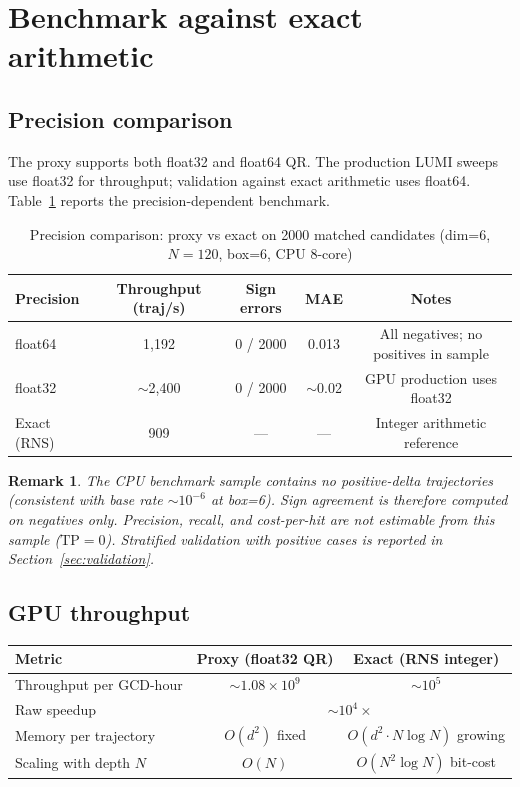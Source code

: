 \documentclass[11pt]{article}
\newtheorem{remark}{Remark}
\begin{document}
\section{Benchmark against exact arithmetic}
\label{sec:benchmark}

\subsection{Precision comparison}

The proxy supports both float32 and float64 QR. The production LUMI sweeps use float32 for throughput; validation against exact arithmetic uses float64. Table~\ref{tab:precision} reports the precision-dependent benchmark.

\begin{table}[h]
\centering
\caption{Precision comparison: proxy vs exact on 2000 matched candidates (dim=6, $N=120$, box=6, CPU 8-core)}
\label{tab:precision}
\begin{tabular}{lcccc}
\toprule
Precision & Throughput (traj/s) & Sign errors & MAE & Notes \\
\midrule
float64 & 1{,}192 & 0 / 2000 & 0.013 & All negatives; no positives in sample \\
float32 & $\sim$2{,}400 & 0 / 2000 & $\sim$0.02 & GPU production uses float32 \\
Exact (RNS) & 909 & --- & --- & Integer arithmetic reference \\
\bottomrule
\end{tabular}
\end{table}

\begin{remark}
The CPU benchmark sample contains no positive-delta trajectories (consistent with base rate $\sim 10^{-6}$ at box=6). Sign agreement is therefore computed on negatives only. Precision, recall, and cost-per-hit are \emph{not estimable} from this sample ($\text{TP} = 0$). Stratified validation with positive cases is reported in Section~\ref{sec:validation}.
\end{remark}

\subsection{GPU throughput}

\begin{center}
\begin{tabular}{lcc}
\toprule
Metric & Proxy (float32 QR) & Exact (RNS integer) \\
\midrule
Throughput per GCD-hour & $\sim 1.08 \times 10^9$ & $\sim 10^5$ \\
Raw speedup & \multicolumn{2}{c}{$\sim 10^4 \times$} \\
Memory per trajectory & $O(d^2)$ fixed & $O(d^2 \cdot N \log N)$ growing \\
Scaling with depth $N$ & $O(N)$ & $O(N^2 \log N)$ bit-cost \\
\bottomrule
\end{tabular}
\end{center}
\end{document}
